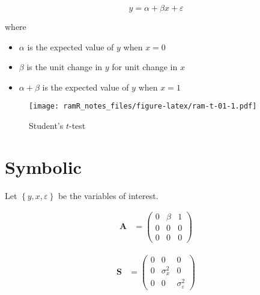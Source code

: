 \documentclass[
]{book}
\providecommand{\tightlist}{%
  \setlength{\itemsep}{0pt}\setlength{\parskip}{0pt}}
\theoremstyle{definition}
\theoremstyle{definition}
\theoremstyle{definition}
\theoremstyle{remark}
\begin{document}
\begin{equation*}
  y
  =
  \alpha + \beta x + \varepsilon
\end{equation*}

\noindent where

\begin{itemize}
\tightlist
\item
  \(\alpha\) is the expected value of \(y\) when \(x = 0\)
\item
  \(\beta\) is the unit change in \(y\) for unit change in \(x\)
\item
  \(\alpha + \beta\) is the expected value of \(y\) when \(x = 1\)
\end{itemize}

\begin{figure}
\centering
\texttt{[image: ramR\_notes\_files/figure-latex/ram-t-01-1.pdf]}
\caption{\label{fig:ram-t-01}Student's \(t\)-test}
\end{figure}

\hypertarget{symbolic}{%
\section{Symbolic}\label{symbolic}}

Let \(\left\{ y, x, \varepsilon \right\}\) be the variables of interest.

\begin{align*}\mathbf{A} &=\left( \begin{array}{ccc} 0 & \beta  & 1 \\ 0 & 0 & 0 \\ 0 & 0 & 0 \end{array} \right)\end{align*}

\begin{align*}\mathbf{S} &=\left( \begin{array}{ccc} 0 & 0 & 0 \\ 0 & \sigma  _{x} ^{2} & 0 \\ 0 & 0 & \sigma  _{\varepsilon } ^{2} \end{array} \right)\end{align*}
\end{document}
